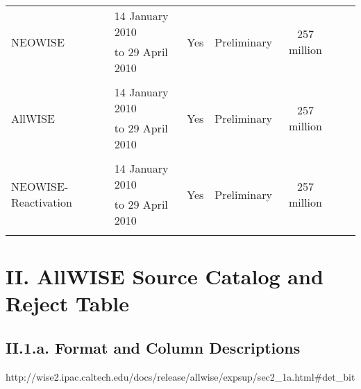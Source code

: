 \documentclass[usenatbib]{mn2e}
\begin{document}
\begin{table*}
\begin{tabular}{l l c c c l r}
\\
\multirow{2}{*}{NEOWISE}            &  14 January 2010           & \multirow{2}{*}{Yes}  & \multirow{2}{*}{Preliminary} & \multirow{2}{*}{257 million} & \\
                                                            &      to 29 April 2010            &                                  &                                                                                                                                                 &              &         & \\ 
\\
\multirow{2}{*}{AllWISE}           &  14 January 2010            & \multirow{2}{*}{Yes}  & \multirow{2}{*}{Preliminary} & \multirow{2}{*}{257 million} & \\
                                                       &      to 29 April 2010             &                                  &                                                                                                                                                 &              &         & \\ 
\\
\multirow{2}{*}{NEOWISE-Reactivation}   &  14 January 2010            & \multirow{2}{*}{Yes}  & \multirow{2}{*}{Preliminary} & \multirow{2}{*}{257 million} & \\
                                                                &      to 29 April 2010             &                                  &                                                                                                                                                 &              &         & \\ 
\\

\hline
\hline
\end{tabular}
       \caption{$^{a}$The detectors continued to be cooled by the hydrogen ice in the inner cryogen tank. The telescope warmed from the 12 K maintained during the main mission to 45 K\footnote{http://wise2.ipac.caltech.edu/docs/release/3band/}.}
       \label{tab:WISE_cats}
\end{table*}



\section{II. AllWISE Source Catalog and Reject Table}

\subsection{II.1.a. Format and Column Descriptions}
http://wise2.ipac.caltech.edu/docs/release/allwise/expsup/sec2\_1a.html\#det\_bit
\end{document}
